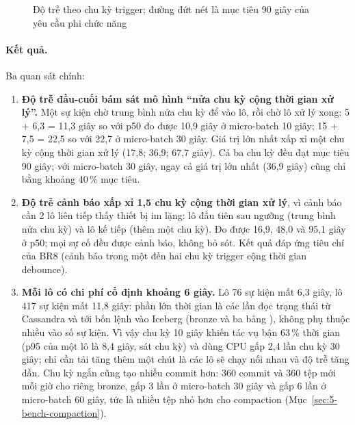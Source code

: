 \begin{figure}[H]
\centering
{}
\caption{Độ trễ theo chu kỳ trigger; đường đứt nét là mục tiêu 90 giây của yêu cầu phi chức năng}
\label{fig:5-bench-trigger}
\end{figure}

\paragraph{Kết quả.} Ba quan sát chính:

\begin{enumerate}
  \item \textbf{Độ trễ đầu-cuối bám sát mô hình ``nửa chu kỳ cộng thời gian xử lý''.} Một sự kiện chờ trung bình nửa chu kỳ để vào lô, rồi chờ lô xử lý xong: 5 + 6,3 = 11,3 giây so với p50 đo được 10,9 giây ở micro-batch 10 giây; 15 + 7,5 = 22,5 so với 22,7 ở micro-batch 30 giây. Giá trị lớn nhất xấp xỉ một chu kỳ cộng thời gian xử lý (17,8; 36,9; 67,7 giây). Cả ba chu kỳ đều đạt mục tiêu 90 giây; với micro-batch 30 giây, ngay cả giá trị lớn nhất (36,9 giây) cũng chỉ bằng khoảng 40\,\% mục tiêu.
  \item \textbf{Độ trễ cảnh báo xấp xỉ 1,5 chu kỳ cộng thời gian xử lý}, vì cảnh báo cần 2 lô liên tiếp thấy thiết bị im lặng: lô đầu tiên sau ngưỡng (trung bình nửa chu kỳ) và lô kế tiếp (thêm một chu kỳ). Đo được 16,9, 48,0 và 95,1 giây ở p50; mọi sự cố đều được cảnh báo, không bỏ sót. Kết quả đáp ứng tiêu chí của BR8 (cảnh báo trong một đến hai chu kỳ trigger cộng thời gian debounce).
  \item \textbf{Mỗi lô có chi phí cố định khoảng 6 giây.} Lô 76 sự kiện mất 6,3 giây, lô 417 sự kiện mất 11,8 giây: phần lớn thời gian là các lần đọc trạng thái từ Cassandra và tới bốn lệnh  vào Iceberg (bronze và ba bảng ), không phụ thuộc nhiều vào số sự kiện. Vì vậy chu kỳ 10 giây khiến tác vụ bận 63\,\% thời gian (p95 của một lô là 8,4 giây, sát chu kỳ) và dùng CPU gấp 2,4 lần chu kỳ 30 giây; chỉ cần tải tăng thêm một chút là các lô sẽ chạy nối nhau và độ trễ tăng dần. Chu kỳ ngắn cũng tạo nhiều commit hơn: 360 commit và 360 tệp mới mỗi giờ cho riêng bronze, gấp 3 lần ở micro-batch 30 giây và gấp 6 lần ở micro-batch 60 giây, tức là nhiều tệp nhỏ hơn cho compaction (Mục~\ref{sec:5-bench-compaction}).
\end{enumerate}

